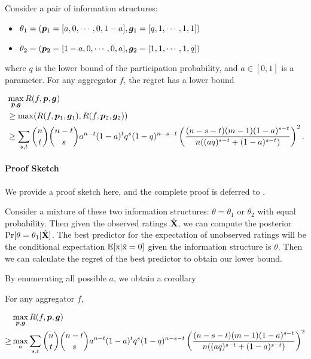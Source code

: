 \begin{lemma}\label{lem:lower}
    Consider a pair of information structures:  
    \begin{itemize}
        \item $\theta_1=({\bm{p}}_1=[a,0,\cdots,0,1-a],{\bm{g}}_1=[q,1,\cdots, 1,1])$
        \item $\theta_2=({\bm{p}}_2=[1-a,0,\cdots,0,a],{\bm{g}}_2=[1,1,\cdots, 1,q])$
    \end{itemize}
    where $q$ is the lower bound of the participation probability, and $a\in[0,1]$ is a parameter. For any aggregator $f$, the regret has a lower bound
    \begin{footnotesize}
        \begin{align*}
            &\max_{{\bm{p}},{\bm{g}}} 
            R(f,{\bm{p}},{\bm{g}})\\
            &\ge\max(R(f,{\bm{p}}_1,{\bm{g}}_1),R(f,{\bm{p}}_2,{\bm{g}}_2))\\
            &\ge\sum_{s,t} \binom{n}{t}\binom{n-t}{s}a^{n-t}(1-a)^tq^s(1-q)^{n-s-t}\left(\frac{(n-s-t)(m-1)(1-a)^{s-t}}{n((aq)^{s-t}+(1-a)^{s-t})}\right)^2.
        \end{align*}
    \end{footnotesize}
\end{lemma}

\paragraph{Proof Sketch}
We provide a proof sketch here, and the complete proof is deferred to .

Consider a mixture of these two information structures: $\theta=\theta_1$ or $\theta_2$ with equal probability. Then given the observed ratings $\hat{{\mathbf{X}}}$, we can compute the posterior
$\Pr[\theta=\theta_1|\hat{{\mathbf{X}}}]$. The best predictor for the expectation of unobserved ratings will be the conditional expectation $\mathbb{E}[{\textnormal{x}}|\hat{{\textnormal{x}}}=0]$ given the information structure is $\theta$. Then we can calculate the regret of the best predictor to obtain our lower bound.


By enumerating all possible $a$, we obtain a corollary 

\begin{corollary}\label{cor:lower}
For any aggregator $f$, 
\begin{footnotesize}
\begin{align*}
    &\max_{{\bm{p}},{\bm{g}}}R(f,{\bm{p}},{\bm{g}})\\
    \ge&\max_a \sum_{s,t} \binom{n}{t}\binom{n-t}{s}a^{n-t}(1-a)^tq^s(1-q)^{n-s-t}\left(\frac{(n-s-t)(m-1)(1-a)^{s-t}}{n((aq)^{s-t}+(1-a)^{s-t})}\right)^2
\end{align*}
\end{footnotesize}
\end{corollary}




